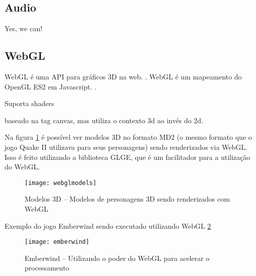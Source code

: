 
\subsection{Audio}
Yes, we can!

\subsection{WebGL}

WebGL é uma API para gráficos 3D na web. \cite{lubbers2010pro}.
WebGL é um mapeamento do OpenGL ES2 em Javascript. \cite{lubbers2010pro}.

Suporta shaders

baseado na tag canvas, mas utiliza o contexto 3d ao invés do 2d.

Na figura \ref{img:webglmodels} é possível ver modelos 3D no formato
MD2 (o mesmo formato que o jogo Quake II utilizava para seus
personagens) sendo renderizados via WebGL. Isso é feito utilizando a
biblioteca GLGE, que é um facilitador para a utilização do WebGL.

\begin{figure}[H]
  \centering
	\texttt{[image: webglmodels]}
  \caption{Modelos 3D {--} Modelos de personagens 3D sendo renderizados com WebGL}
  \label{img:webglmodels}
\end{figure}

\clearpage

Exemplo do jogo Emberwind sendo executado utilizando WebGL \ref{img:emberwind}

\begin{figure}[H]
  \centering
	\texttt{[image: emberwind]}
  \caption{Emberwind {--} Utilizando o poder do WebGL para acelerar o processamento}
  \label{img:emberwind}
\end{figure}

\clearpage
